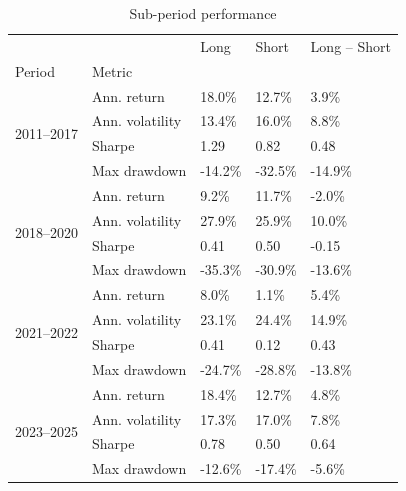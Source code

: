 \begin{table}
\caption{Sub-period performance}
\label{tab:sub}
\begin{tabular}{lllll}
\toprule
 &  & Long & Short & Long – Short \\
Period & Metric &  &  &  \\
\midrule
\multirow[t]{4}{*}{2011–2017} & Ann. return & 18.0\% & 12.7\% & 3.9\% \\
 & Ann. volatility & 13.4\% & 16.0\% & 8.8\% \\
 & Sharpe & 1.29 & 0.82 & 0.48 \\
 & Max drawdown & -14.2\% & -32.5\% & -14.9\% \\
\cline{1-5}
\multirow[t]{4}{*}{2018–2020} & Ann. return & 9.2\% & 11.7\% & -2.0\% \\
 & Ann. volatility & 27.9\% & 25.9\% & 10.0\% \\
 & Sharpe & 0.41 & 0.50 & -0.15 \\
 & Max drawdown & -35.3\% & -30.9\% & -13.6\% \\
\cline{1-5}
\multirow[t]{4}{*}{2021–2022} & Ann. return & 8.0\% & 1.1\% & 5.4\% \\
 & Ann. volatility & 23.1\% & 24.4\% & 14.9\% \\
 & Sharpe & 0.41 & 0.12 & 0.43 \\
 & Max drawdown & -24.7\% & -28.8\% & -13.8\% \\
\cline{1-5}
\multirow[t]{4}{*}{2023–2025} & Ann. return & 18.4\% & 12.7\% & 4.8\% \\
 & Ann. volatility & 17.3\% & 17.0\% & 7.8\% \\
 & Sharpe & 0.78 & 0.50 & 0.64 \\
 & Max drawdown & -12.6\% & -17.4\% & -5.6\% \\
\cline{1-5}
\bottomrule
\end{tabular}
\end{table}
